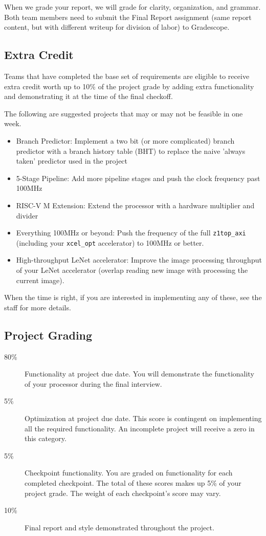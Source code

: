 \documentclass[11pt]{article}
\begin{document}
When we grade your report, we will grade for clarity, organization, and grammar.
Both team members need to submit the Final Report assignment (same report content, but with different writeup for division of labor) to Gradescope.

\subsection{Extra Credit}
\label{extra_credit}
Teams that have completed the base set of requirements are eligible to receive extra credit worth up to 10\% of the project grade by adding extra functionality and demonstrating it at the time of the final checkoff.

The following are suggested projects that may or may not be feasible in one week.
\begin{itemize}
  \item Branch Predictor: Implement a two bit (or more complicated) branch predictor with a branch history table (BHT) to replace the naive 'always taken' predictor used in the project
  \item 5-Stage Pipeline: Add more pipeline stages and push the clock frequency past 100MHz
  \item RISC-V M Extension: Extend the processor with a hardware multiplier and divider
  \item Everything 100MHz or beyond: Push the frequency of the full \verb|z1top_axi| (including your \verb|xcel_opt| accelerator) to 100MHz or better.
  \item High-throughput LeNet accelerator: Improve the image processing throughput of your LeNet accelerator (overlap reading new image with processing the current image).
\end{itemize}

When the time is right, if you are interested in implementing any of these, see the staff for more details.

\subsection{Project Grading}
\label{deadlinegrading}

\begin{description}
  \item[80\%] {Functionality} at project due date. You will demonstrate the functionality of your processor during the final interview.
  \item[5\%] {Optimization} at project due date. This score is contingent on implementing all the required functionality. An incomplete project will receive a zero in this category.
  \item[5\%] {Checkpoint} functionality. You are graded on functionality for each completed checkpoint. The total of these scores makes up 5\% of your project grade. The weight of each checkpoint's score may vary.
  \item[10\%] {Final report} and {style} demonstrated throughout the project.
\end{description}
\end{document}
